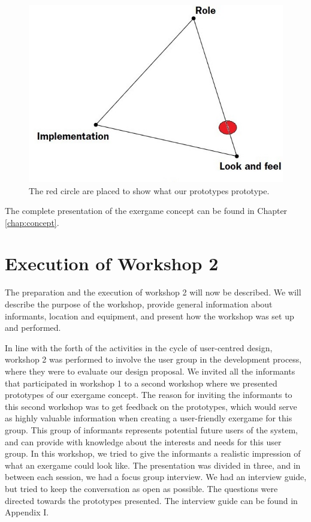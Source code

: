 \begin{figure} [H]
\centering
\includegraphics[scale=0.4]{prototypemodelDobbel}
\caption[Prototype model placing our prototype]{The red circle are placed to show what our prototypes prototype.}
\label{fig:prototype2}
\end{figure}

The complete presentation of the exergame concept can be found in Chapter \ref{chap:concept}.
 
\section{Execution of Workshop 2}
\label{sec:ws2}
The preparation and the execution of workshop 2 will now be described. We will describe the purpose of the workshop, provide general information about informants, location and equipment, and present how the workshop was set up and performed. 

In line with the forth of the activities in the cycle of user-centred design, workshop 2 was performed to involve the user group in the development process, where they were to evaluate our design proposal. We invited all the informants that participated in workshop 1 to a second workshop where we presented prototypes of our exergame concept. The reason for inviting the informants to this second workshop was to get feedback on the prototypes, which would serve as highly valuable information when creating a user-friendly exergame for this group. This group of informants represents potential future users of the system, and can provide with knowledge about the interests and needs for this user group. In this workshop, we tried to give the informants a realistic impression of what an exergame could look like. The presentation was divided in three, and in between each session, we had a focus group interview. We had an interview guide, but tried to keep the conversation as open as possible. The questions were directed towards the prototypes presented. The interview guide  can be found in Appendix I.

